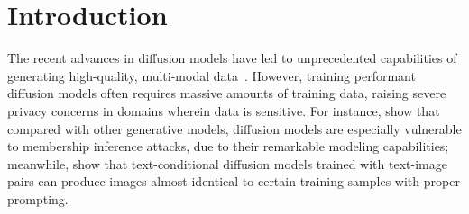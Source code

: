 
\section{Introduction} \label{Introduction}

The recent advances in diffusion models have led to unprecedented capabilities of generating high-quality, multi-modal data~\citep{ho2020denoising,kong2020diffwave,bar2024lumiere}. However, training performant diffusion models often requires massive amounts of training data, raising severe privacy concerns in domains wherein data is sensitive. For instance,  \citet{carlini2023extracting} show that compared with other generative models, diffusion models are especially vulnerable to membership inference attacks, due to their remarkable modeling capabilities; meanwhile, \citet{wen2023detecting} show that text-conditional diffusion models trained with text-image pairs can produce images almost identical to certain training samples with proper prompting.






